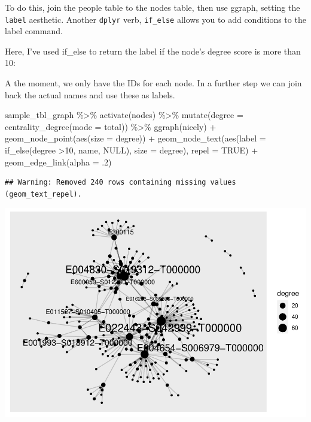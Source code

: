 \documentclass[
]{book}
\newenvironment{Shaded}{\begin{snugshade}}{\end{snugshade}}
\newcommand{\AttributeTok}[1]{\textcolor[rgb]{0.77,0.63,0.00}{#1}}
\newcommand{\ConstantTok}[1]{\textcolor[rgb]{0.00,0.00,0.00}{#1}}
\newcommand{\DecValTok}[1]{\textcolor[rgb]{0.00,0.00,0.81}{#1}}
\newcommand{\FunctionTok}[1]{\textcolor[rgb]{0.00,0.00,0.00}{#1}}
\newcommand{\NormalTok}[1]{#1}
\newcommand{\SpecialCharTok}[1]{\textcolor[rgb]{0.00,0.00,0.00}{#1}}
\newcommand{\StringTok}[1]{\textcolor[rgb]{0.31,0.60,0.02}{#1}}
\begin{document}
To do this, join the people table to the nodes table, then use ggraph, setting the \texttt{label} aesthetic. Another \texttt{dplyr} verb, \texttt{if\_else} allows you to add conditions to the label command.

Here, I've used if\_else to return the label if the node's degree score is more than 10:

A the moment, we only have the IDs for each node. In a further step we can join back the actual names and use these as labels.

\begin{Shaded}
\begin{Highlighting}[]
\NormalTok{sample\_tbl\_graph }\SpecialCharTok{\%\textgreater{}\%} 
  \FunctionTok{activate}\NormalTok{(nodes) }\SpecialCharTok{\%\textgreater{}\%} 
  \FunctionTok{mutate}\NormalTok{(}\AttributeTok{degree =} \FunctionTok{centrality\_degree}\NormalTok{(}\AttributeTok{mode =} \StringTok{\textquotesingle{}total\textquotesingle{}}\NormalTok{))  }\SpecialCharTok{\%\textgreater{}\%} 
  \FunctionTok{ggraph}\NormalTok{(}\StringTok{\textquotesingle{}nicely\textquotesingle{}}\NormalTok{) }\SpecialCharTok{+} 
  \FunctionTok{geom\_node\_point}\NormalTok{(}\FunctionTok{aes}\NormalTok{(}\AttributeTok{size =}\NormalTok{ degree)) }\SpecialCharTok{+} 
  \FunctionTok{geom\_node\_text}\NormalTok{(}\FunctionTok{aes}\NormalTok{(}\AttributeTok{label =} \FunctionTok{if\_else}\NormalTok{(degree }\SpecialCharTok{\textgreater{}}\DecValTok{10}\NormalTok{, name, }\ConstantTok{NULL}\NormalTok{), }\AttributeTok{size =}\NormalTok{ degree), }\AttributeTok{repel =} \ConstantTok{TRUE}\NormalTok{) }\SpecialCharTok{+} 
  \FunctionTok{geom\_edge\_link}\NormalTok{(}\AttributeTok{alpha =}\NormalTok{ .}\DecValTok{2}\NormalTok{)}
\end{Highlighting}
\end{Shaded}

\begin{verbatim}
## Warning: Removed 240 rows containing missing values (geom_text_repel).
\end{verbatim}

\includegraphics{_main_files/figure-latex/unnamed-chunk-65-1.pdf}
\end{document}
